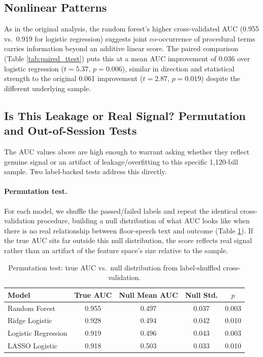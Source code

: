 \subsection{Nonlinear Patterns}

As in the original analysis, the random forest's higher cross-validated AUC (0.955 vs.\ 0.919 for logistic regression) suggests joint co-occurrence of procedural terms carries information beyond an additive linear score. The paired comparison (Table \ref{tab:paired_ttest}) puts this at a mean AUC improvement of 0.036 over logistic regression ($t=5.37$, $p=0.006$), similar in direction and statistical strength to the original 0.061 improvement ($t=2.87$, $p=0.019$) despite the different underlying sample.

\subsection{Is This Leakage or Real Signal? Permutation and Out-of-Session Tests}
\label{sec:leakage-audit}

The AUC values above are high enough to warrant asking whether they reflect genuine signal or an artifact of leakage/overfitting to this specific 1,120-bill sample. Two label-backed tests address this directly.

\paragraph{Permutation test.} For each model, we shuffle the passed/failed labels and repeat the identical cross-validation procedure, building a null distribution of what AUC looks like when there is no real relationship between floor-speech text and outcome (Table \ref{tab:permutation}). If the true AUC sits far outside this null distribution, the score reflects real signal rather than an artifact of the feature space's size relative to the sample.

\begin{table}[htbp]
\centering
\caption{Permutation test: true AUC vs.\ null distribution from label-shuffled cross-validation.}
\label{tab:permutation}
\begin{tabular}{lcccc}
\toprule
\textbf{Model} & \textbf{True AUC} & \textbf{Null Mean AUC} & \textbf{Null Std.} & \textbf{$p$} \\
\midrule
Random Forest       & 0.955 & 0.497 & 0.037 & 0.003 \\
Ridge Logistic       & 0.928 & 0.494 & 0.042 & 0.010 \\
Logistic Regression  & 0.919 & 0.496 & 0.043 & 0.003 \\
LASSO Logistic       & 0.918 & 0.503 & 0.033 & 0.010 \\
\bottomrule
\end{tabular}
\end{table}

